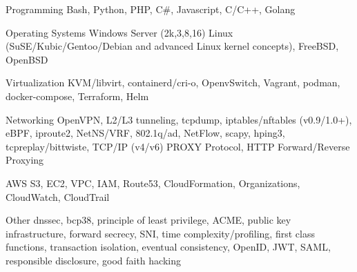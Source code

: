 
\begin{cvskills}

\cvskill
{Programming} 
{Bash, Python, PHP, C\#, Javascript, C/C++, Golang}

\cvskill
{Operating Systems} 
{Windows Server (2k,3,8,16) Linux (SuSE/Kubic/Gentoo/Debian and advanced Linux kernel concepts), FreeBSD, OpenBSD}

\cvskill
{Virtualization}
{KVM/libvirt, containerd/cri-o, OpenvSwitch, Vagrant, podman, docker-compose, Terraform, Helm}

\cvskill
{Networking} 
{OpenVPN, L2/L3 tunneling, tcpdump, iptables/nftables (v0.9/1.0+), eBPF, iproute2, NetNS/VRF, 802.1q/ad, NetFlow, scapy, hping3, tcpreplay/bittwiste, TCP/IP (v4/v6) PROXY Protocol, HTTP Forward/Reverse Proxying} 

\cvskill
{AWS}
{S3, EC2, VPC, IAM, Route53, CloudFormation, Organizations, CloudWatch, CloudTrail}

\cvskill
{Other}
{dnssec, bcp38, principle of least privilege, ACME, public key infrastructure, forward secrecy, SNI, time complexity/profiling, first class functions, transaction isolation, eventual consistency, OpenID, JWT, SAML, responsible disclosure, good faith hacking}
\end{cvskills}

